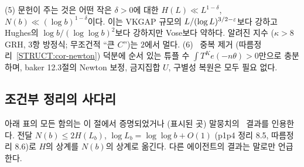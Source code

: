 \begin{remark}
(5)  문헌이 주는 것은 어떤 작은 $\delta>0$에 대한 $H(L)\ll L^{1-\delta}$, $N(b)\ll(\log b)^{1-\delta}$이다. 이는 VKGAP 규모의 $L/(\log L)^{3/2-\varepsilon}$보다 강하고 Hughes의 $\log b/(\log\log b)^2$보다 강하지만 Vose보다 약하다. 알려진 지수 ($\kappa>8$ GRH, 3항 방정식; 무조건적 ``큰 $C$'')는 $2$에서 멀다.
(6) \PROVED\ 중복 제거 (따름정리~\ref{STRUCT:cor-newton}) 덕분에 순서 있는 튜플 수 $\int T^Ke(-n\theta)>0$만으로 충분하며, baker 12.3절의 Newton 보정, 금지집합 $U$, 구별성 복원은 모두 필요 없다.
\end{remark}

\subsection{조건부 정리의 사다리}
\label{STRUCT:sec-ladder}

아래 표의 모든 함의는 이 절에서 증명되었거나 (표시된 곳) 말뭉치의 \PROVED\ 결과를 인용한다. 전달 $N(b)\le2H(L_b)$, $\log L_b=\log\log b+O(1)$ (p1p4 정리 8.5, 따름정리 8.6)로 $H$의 상계를 $N(b)$의 상계로 옮긴다. 다른 에이전트의 결과는 말로만 언급한다.


